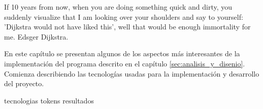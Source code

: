 %
%
%

\label{sec:implementacion}
{%
  If 10 years from now, when you are doing something quick and dirty, you
  suddenly visualize that I am looking over your shoulders and say to
  yourself: 'Dijkstra would not have liked this', well that would be enough
  immortality for me.%
}
{%
   Edsger Dijkstra.%
}

\noindent
En este capítulo se presentan algunos de los aspectos más interesantes de
la implementación del programa descrito en el capítulo
\ref{sec:analisis_y_disenio}. Comienza describiendo las tecnologías
usadas para la implementación y desarrollo del proyecto.

{tecnologias}
{tokens}
{resultados}
